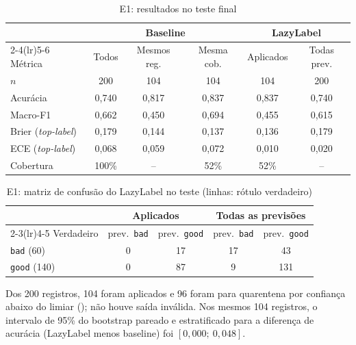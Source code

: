 \begin{table}[htb]
  \centering
  \caption{E1: resultados no teste final}
  \label{tab:e1}
  \small
  \begin{tabular}{lccccc}
    \toprule
    & \multicolumn{3}{c}{Baseline} & \multicolumn{2}{c}{LazyLabel} \\
    \cmidrule(lr){2-4}\cmidrule(lr){5-6}
    Métrica & Todos & Mesmos reg. & Mesma cob. & Aplicados & Todas prev. \\
    \midrule
    $n$ & 200 & 104 & 104 & 104 & 200 \\
    Acurácia & 0,740 & 0,817 & 0,837 & 0,837 & 0,740 \\
    Macro-F1 & 0,662 & 0,450 & 0,694 & 0,455 & 0,615 \\
    Brier (\emph{top-label}) & 0,179 & 0,144 & 0,137 & 0,136 & 0,179 \\
    ECE (\emph{top-label}) & 0,068 & 0,059 & 0,072 & 0,010 & 0,020 \\
    Cobertura & 100\% & -- & 52\% & 52\% & -- \\
    \bottomrule
  \end{tabular}
\end{table}

\begin{table}[htb]
  \centering
  \caption{E1: matriz de confusão do LazyLabel no teste (linhas: rótulo verdadeiro)}
  \label{tab:e1-confusao}
  \begin{tabular}{lcccc}
    \toprule
    & \multicolumn{2}{c}{Aplicados} & \multicolumn{2}{c}{Todas as previsões} \\
    \cmidrule(lr){2-3}\cmidrule(lr){4-5}
    Verdadeiro & prev.\ \texttt{bad} & prev.\ \texttt{good} & prev.\ \texttt{bad} & prev.\ \texttt{good} \\
    \midrule
    \texttt{bad} (60) & 0 & 17 & 17 & 43 \\
    \texttt{good} (140) & 0 & 87 & 9 & 131 \\
    \bottomrule
  \end{tabular}
\end{table}

Dos 200 registros, 104 foram aplicados e 96 foram para quarentena por confiança abaixo do limiar (); não houve saída inválida. Nos mesmos 104 registros, o intervalo de 95\% do bootstrap pareado e estratificado para a diferença de acurácia (LazyLabel menos baseline) foi $[0{,}000;\ 0{,}048]$.

